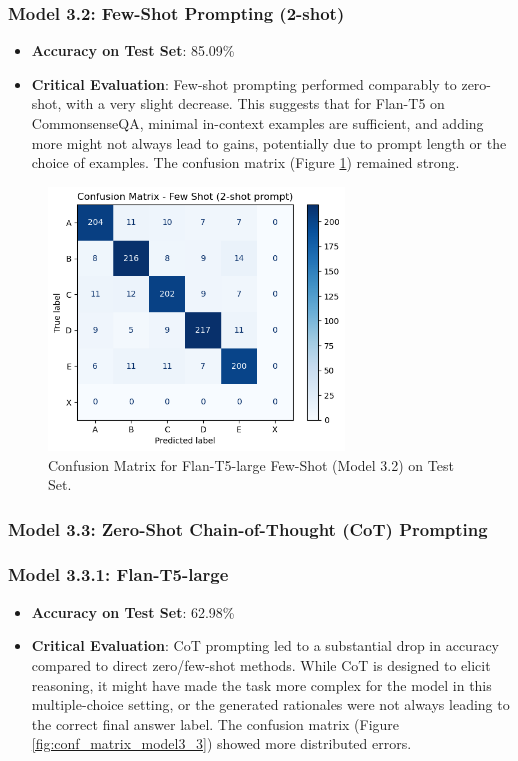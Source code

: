 \documentclass[10.5pt]{article}
\begin{document}
\subsubsection{Model 3.2: Few-Shot Prompting (2-shot)}
\begin{itemize}
    \item \textbf{Accuracy on Test Set}: 85.09\%
    \item \textbf{Critical Evaluation}: Few-shot prompting performed comparably to zero-shot, with a very slight decrease. This suggests that for Flan-T5 on CommonsenseQA, minimal in-context examples are sufficient, and adding more might not always lead to gains, potentially due to prompt length or the choice of examples. The confusion matrix (Figure \ref{fig:conf_matrix_model3_2}) remained strong.
\end{itemize}

\begin{figure}[htbp]
    \centering
    \includegraphics[width=0.7\textwidth]{images/model3_2_confusion_matrix.png}
    \caption{Confusion Matrix for Flan-T5-large Few-Shot (Model 3.2) on Test Set.}
    \label{fig:conf_matrix_model3_2}
\end{figure}

\subsubsection{Model 3.3: Zero-Shot Chain-of-Thought (CoT) Prompting}
\subsubsection{Model 3.3.1: Flan-T5-large}
\begin{itemize}
    \item \textbf{Accuracy on Test Set}: 62.98\%
    \item \textbf{Critical Evaluation}: CoT prompting led to a substantial drop in accuracy compared to direct zero/few-shot methods. While CoT is designed to elicit reasoning, it might have made the task more complex for the model in this multiple-choice setting, or the generated rationales were not always leading to the correct final answer label. The confusion matrix (Figure \ref{fig:conf_matrix_model3_3}) showed more distributed errors.
\end{itemize}
\end{document}
